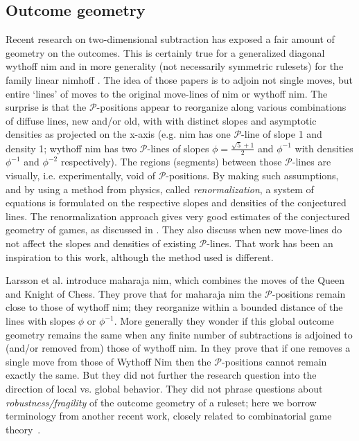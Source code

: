 \documentclass{amsart}
\theoremstyle{plain}
\theoremstyle{definition}
\renewcommand{\P}{\ensuremath{\mathcal P}}
\begin{document}
\subsection{Outcome geometry}\label{sec:geom}
Recent research on {\sc two-dimensional subtraction} has exposed a fair amount of geometry on the outcomes. This is certainly true for a {\sc generalized diagonal wythoff nim} \cite{Larsson2012GDWN,Larsson2014split} and in more generality (not necessarily symmetric rulesets) for the family {\sc linear nimhoff} \cite{friedman2019geometric}. The idea of those papers is to adjoin not single moves, but entire `lines' of moves to the original move-lines of {\sc nim} or {\sc wythoff nim}. The surprise is that the \P-positions appear to reorganize along various combinations of diffuse lines, new and/or old, with with distinct slopes and asymptotic densities as projected on the x-axis (e.g. {\sc nim} has one \P-line of slope 1 and density 1; {\sc wythoff nim} has two \P-lines of slopes $\phi=\frac{\sqrt{5}+1}{2}$ and $\phi^{-1}$ with densities $\phi^{-1}$ and $\phi^{-2}$ respectively). The regions (segments) between those \P-lines are visually, i.e. experimentally, void of \P-positions.  By making such assumptions, and by using a method from physics, called {\em renormalization}, a system of equations is formulated on the respective slopes and densities of the conjectured lines. The renormalization approach gives very good estimates of the conjectured geometry of games, as discussed in \cite{friedman2019geometric}. They also discuss when new move-lines do not affect the slopes and densities of existing \P-lines. That work has been an inspiration to this work, although the method used is different. 

Larsson et al. \cite{larsson2014maharaja}  introduce {\sc  maharaja nim}, which combines the moves of the Queen and Knight of Chess.  
They prove that for  {\sc  maharaja nim} the \P-positions remain close to those of {\sc wythoff nim}; they reorganize  within a bounded distance of the lines with slopes  $\phi$ or  $\phi^{-1}$. More generally they wonder if this global outcome geometry remains the same when any finite number of subtractions is adjoined to (and/or removed from) those of {\sc wythoff nim}. In \cite{duchene2009another} they prove that if one removes a single move from those of {\sc Wythoff Nim} then the \P-positions cannot remain exactly the same. But they did not further the research question into the direction of local vs. global behavior. They did not  phrase questions about {\em robustness/fragility} of the outcome geometry of a ruleset; here we borrow terminology from another recent work, closely related to combinatorial game theory~\cite{yakovurban}.
\end{document}

